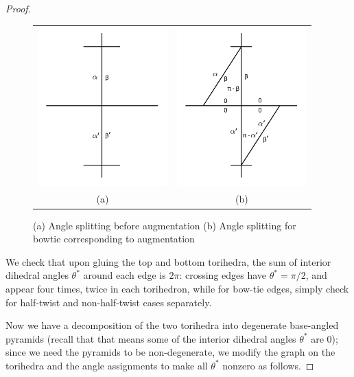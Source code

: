 \documentclass[11pt]{amsart}
\theoremstyle{plain}
\theoremstyle{definition}
\begin{document}
\begin{proof}
\begin{figure}
\begin{tabular}{cc}
\includegraphics[width = 5cm]{before_bowtie_angles.png}&
\includegraphics[width = 5cm]{bowtie_angles.png}\\
(a)&(b)
\end{tabular}
\caption{(a) Angle splitting before augmentation (b) Angle splitting for bowtie corresponding to augmentation}
\label{f:bowtie_angles2}
\end{figure}

We check that upon gluing the top and bottom torihedra,
the sum of interior dihedral angles $\theta^*$
around each edge is $2\pi$:
crossing edges have $\theta^* = \pi/2$,
and appear four times, twice in each torihedron,
while for bow-tie edges,
simply check for half-twist and non-half-twist cases
separately.


Now we have a decomposition of the two torihedra into
degenerate base-angled pyramids
(recall that that means some of the
interior dihedral angles $\theta^*$ are 0);
since we need the pyramids to be non-degenerate,
we modify the graph on the torihedra
and the angle assignments to make all $\theta^*$ nonzero
as follows.



\end{proof}
\end{document}
